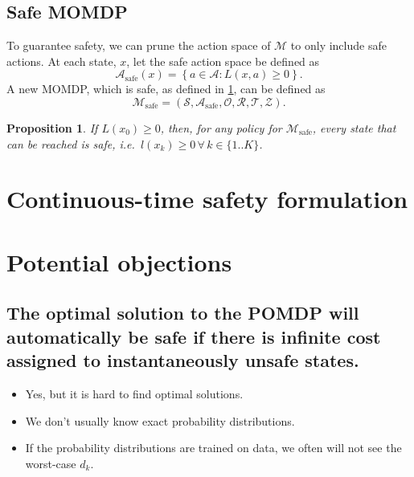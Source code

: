 \documentclass{article}
\newtheorem{prop}{Proposition}
\newcommand{\sspace}{\ensuremath{\mathcal{S}} }
\newcommand{\aspace}{\ensuremath{\mathcal{A}} }
\newcommand{\ospace}{\ensuremath{\mathcal{O}} }
\newcommand{\tdist}{\ensuremath{\mathcal{T}} }
\newcommand{\odist}{\ensuremath{\mathcal{Z}} }
\newcommand{\reward}{\ensuremath{\mathcal{R}} }
\begin{document}
\subsection{Safe MOMDP}

To guarantee safety, we can prune the action space of $\mathcal{M}$ to only include safe actions. At each state, $x$, let the safe action space be defined as
\begin{equation}
    \aspace_\text{safe}(x) = \left\{a \in \aspace : L(x,a) \geq 0 \right\} \text{.}
\end{equation}
A new MOMDP, which is safe, as defined in \cref{prop:safe}, can be defined as
\begin{equation}
    \mathcal{M}_\text{safe} = (\sspace, \aspace_\text{safe}, \ospace, \reward, \tdist, \odist) \text{.}
\end{equation}

\begin{prop}
    If $L(x_0)\geq 0$, then, for any policy for $\mathcal{M}_\text{safe}$, every state that can be reached is safe, i.e.\ $l(x_k) \geq 0 \, \forall\, k \in \{1..K\}$.
    \label{prop:safe}
\end{prop}

\section{Continuous-time safety formulation}


\section{Potential objections}

\subsection{The optimal solution to the POMDP will automatically be safe if there is infinite cost assigned to instantaneously unsafe states.}

\begin{itemize}
    \item Yes, but it is hard to find optimal solutions.
    \item We don't usually know exact probability distributions.
    \item If the probability distributions are trained on data, we often will not see the worst-case $d_k$.
\end{itemize}
\end{document}
